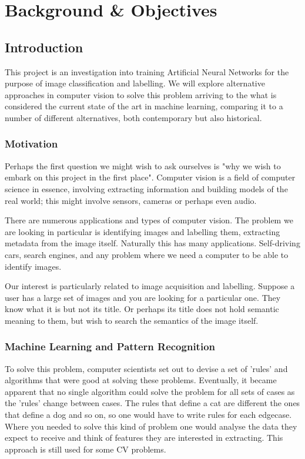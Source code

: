 \chapter{Background \& Objectives}

\section{Introduction}
This project is an investigation into training Artificial Neural Networks for the purpose of image classification and labelling. We will explore alternative approaches in computer vision to solve this problem arriving to the what is considered the current state of the art in machine learning, comparing it to a number of different alternatives, both contemporary but also historical.

\subsection{Motivation}
Perhaps the first question we might wish to ask ourselves is "why we wish to embark on this project in the first place". Computer vision is a field of computer science in essence, involving extracting information and building models of the real world; this might involve sensors, cameras or perhaps even audio.

There are numerous applications and types of computer vision. The problem we are looking in particular is identifying images and labelling them, extracting metadata from the image itself. Naturally this has many applications. Self-driving cars, search engines, and any problem where we need a computer to be able to identify images.

Our interest is particularly related to image acquisition and labelling. Suppose a user has a large set of images and you are looking for a particular one. They know what it is but not its title. Or perhaps its title does not hold semantic meaning to them, but wish to search the semantics of the image itself.

\subsection{Machine Learning and Pattern Recognition}
To solve this problem, computer scientists set out to devise a set of 'rules' and algorithms that were good at solving these problems. Eventually, it became apparent that no single algorithm could solve the problem for all sets of cases as the 'rules' change between cases. The rules that define a cat are different the ones that define a dog and so on, so one would have to write rules for each edgecase. Where you needed to solve this kind of problem one would analyse the data they expect to receive and think of features they are interested in extracting. This approach is still used for some CV problems.

